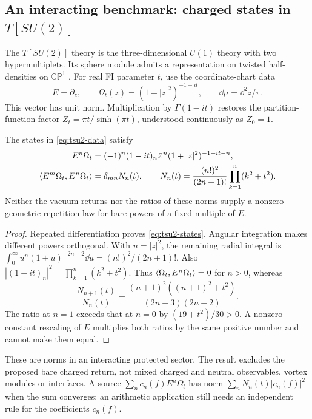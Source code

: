 \subsection{An interacting benchmark: charged states in \texorpdfstring{$T[SU(2)]$}{T[SU(2)]}}
The $T[SU(2)]$ theory is the three-dimensional $U(1)$ theory with two
hypermultiplets. Its sphere module admits a representation on twisted
half-densities on $\mathbb{CP}^1$ \cite[Section 3.2]{Sphere}. For real
FI parameter $t$, use the coordinate-chart data
\begin{equation}\label{eq:tsu2-data}
 E=\partial_z,\qquad \Omega_t(z)=(1+|z|^2)^{-1+it},
 \qquad \dd\mu=\dd^2z/\pi.
\end{equation}
This vector has unit norm. Multiplication by $\Gamma(1-it)$ restores
the partition-function factor $Z_t=\pi t/\sinh(\pi t)$, understood
continuously as $Z_0=1$.

\begin{proposition}\label{prop:tsu2}
The states in \eqref{eq:tsu2-data} satisfy
\begin{align}
 E^n\Omega_t&=(-1)^n(1-it)_n\bar z^{\,n}
                  (1+|z|^2)^{-1+it-n},\label{eq:tsu2-states}\\
 \langle E^m\Omega_t,E^n\Omega_t\rangle&=\delta_{mn}N_n(t),\qquad
 N_n(t)=\frac{(n!)^2}{(2n+1)!}\prod_{k=1}^n(k^2+t^2).
 \label{eq:tsu2-norm}
\end{align}
Neither the vacuum returns nor the ratios of these norms supply a
nonzero geometric repetition law for bare powers of a fixed multiple of $E$.
\end{proposition}
\begin{proof}
Repeated differentiation proves \eqref{eq:tsu2-states}. Angular
integration makes different powers orthogonal. With $u=|z|^2$, the
remaining radial integral is
$\int_0^\infty u^n(1+u)^{-2n-2}\dd u=(n!)^2/(2n+1)!$.
Also $|(1-it)_n|^2=\prod_{k=1}^n(k^2+t^2)$.
Thus $\langle \Omega_t,E^n\Omega_t\rangle=0$ for $n>0$, whereas
\begin{equation}\label{eq:tsu2-ratio}
 \frac{N_{n+1}(t)}{N_n(t)}
 =\frac{(n+1)^2((n+1)^2+t^2)}{(2n+3)(2n+2)}.
\end{equation}
The ratio at $n=1$ exceeds that at $n=0$ by $(19+t^2)/30>0$.
A nonzero constant rescaling of $E$ multiplies both ratios by the same
positive number and cannot make them equal.
\end{proof}
These are norms in an interacting protected sector. The result excludes
the proposed bare charged return, not mixed charged and neutral
observables, vortex modules or interfaces. A source
$\sum_n c_n(f)E^n\Omega_t$ has norm $\sum_nN_n(t)|c_n(f)|^2$ when
the sum converges; an arithmetic application still needs an independent
rule for the coefficients $c_n(f)$.
